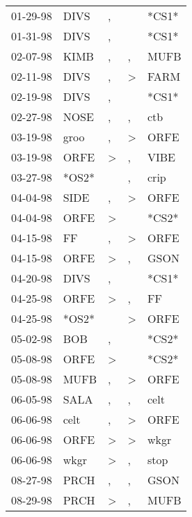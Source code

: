\begin{supertabular}{lllll}
 01-29-98 &   DIVS &             , &               &  *CS1* \\
 01-31-98 &   DIVS &             , &               &  *CS1* \\
 02-07-98 &   KIMB &             , &             , &   MUFB \\
 02-11-98 &   DIVS &             , &  \textgreater &   FARM \\
 02-19-98 &   DIVS &             , &               &  *CS1* \\
 02-27-98 &   NOSE &             , &             , &    ctb \\
 03-19-98 &   groo &             , &  \textgreater &   ORFE \\
 03-19-98 &   ORFE &  \textgreater &             , &   VIBE \\
 03-27-98 &  *OS2* &               &             , &   crip \\
 04-04-98 &   SIDE &             , &  \textgreater &   ORFE \\
 04-04-98 &   ORFE &  \textgreater &               &  *CS2* \\
 04-15-98 &     FF &             , &  \textgreater &   ORFE \\
 04-15-98 &   ORFE &  \textgreater &             , &   GSON \\
 04-20-98 &   DIVS &             , &               &  *CS1* \\
 04-25-98 &   ORFE &  \textgreater &             , &     FF \\
 04-25-98 &  *OS2* &               &  \textgreater &   ORFE \\
 05-02-98 &    BOB &             , &               &  *CS2* \\
 05-08-98 &   ORFE &  \textgreater &               &  *CS2* \\
 05-08-98 &   MUFB &             , &  \textgreater &   ORFE \\
 06-05-98 &   SALA &             , &             , &   celt \\
 06-06-98 &   celt &             , &  \textgreater &   ORFE \\
 06-06-98 &   ORFE &  \textgreater &  \textgreater &   wkgr \\
 06-06-98 &   wkgr &  \textgreater &             , &   stop \\
 08-27-98 &   PRCH &             , &             , &   GSON \\
 08-29-98 &   PRCH &  \textgreater &             , &   MUFB \\

\end{supertabular}
